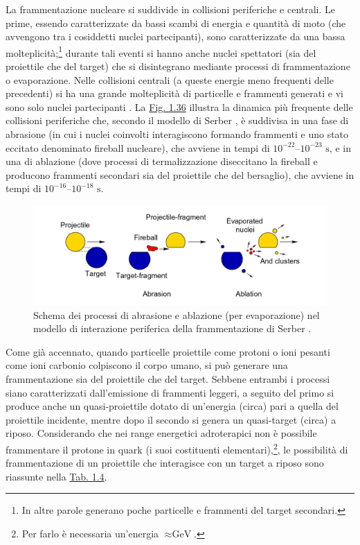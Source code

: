 \documentclass[12pt,a4paper,twoside]{report}
\begin{document}
	La frammentazione nucleare si suddivide in collisioni periferiche e centrali. Le prime, essendo caratterizzate da bassi scambi di energia e quantità di moto (che avvengono tra i cosiddetti nuclei partecipanti), sono caratterizzate da una bassa molteplicità;\footnote{In altre parole generano poche particelle e frammenti del target secondari.} durante tali eventi si hanno anche nuclei spettatori (sia del proiettile che del target) che si disintegrano mediante processi di frammentazione o evaporazione. Nelle collisioni centrali (a queste energie meno frequenti delle precedenti) si ha una grande molteplicità di particelle e frammenti generati e vi sono solo nuclei partecipanti \cite{lnf_document}. La \hyperref[fig:fragmentation]{Fig. 1.36} illustra la dinamica più frequente delle collisioni periferiche che, secondo il modello di Serber \cite{PhysRev.72.1114}, è suddivisa in una fase di abrasione (in cui i nuclei coinvolti interagiscono formando frammenti e uno stato eccitato denominato fireball nucleare), che avviene in tempi di $10^{-22}$--$10^{-23}\mbox{ s}$, e in una di ablazione (dove processi di termalizzazione diseccitano la fireball e producono frammenti secondari sia del proiettile che del bersaglio), che avviene in tempi di $10^{-16}$--$10^{-18}\mbox{ s}$.
	\begin{figure}[H]
		\centering
		\includegraphics[width=0.9\linewidth]{fragmentation.png}
		\caption{Schema dei processi di abrasione e ablazione (per evaporazione) nel modello di interazione periferica della frammentazione di Serber \cite{Schardt2010-bc}.}
		\label{fig:fragmentation}
	\end{figure}
	Come già accennato, quando particelle proiettile come protoni o ioni pesanti come ioni carbonio colpiscono il corpo umano, si può generare una frammentazione sia del proiettile che del target. Sebbene entrambi i processi siano caratterizzati dall'emissione di frammenti leggeri, a seguito del primo si produce anche un quasi-proiettile dotato di un'energia (circa) pari a quella del proiettile incidente, mentre dopo il secondo si genera un quasi-target (circa) a riposo. Considerando che nei range energetici adroterapici non è possibile frammentare il protone in quark (i suoi costituenti elementari),\footnote{Per farlo è necessaria un'energia $\approx\mbox{GeV}$.}, le possibilità di frammentazione di un proiettile che interagisce con un target a riposo sono riassunte nella \hyperref[tab:fragmentation]{Tab. 1.4}.
\end{document}
